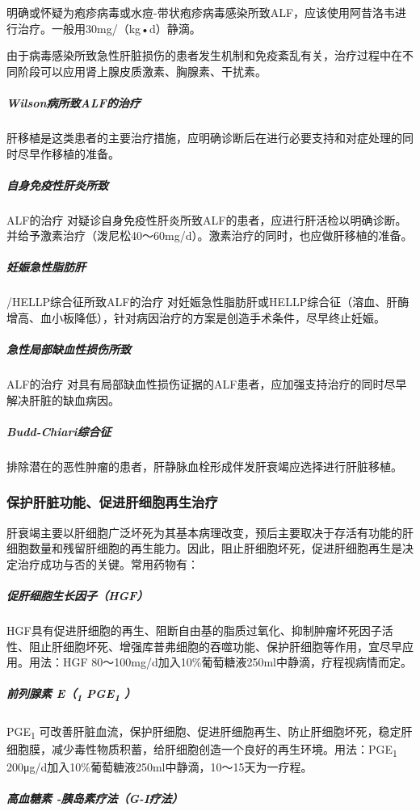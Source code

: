 明确或怀疑为疱疹病毒或水痘-带状疱疹病毒感染所致ALF，应该使用阿昔洛韦进行治疗。一般用30mg/（kg•d）静滴。

由于病毒感染所致急性肝脏损伤的患者发生机制和免疫紊乱有关，治疗过程中在不同阶段可以应用肾上腺皮质激素、胸腺素、干扰素。

\subparagraph{Wilson病所致ALF的治疗}

肝移植是这类患者的主要治疗措施，应明确诊断后在进行必要支持和对症处理的同时尽早作移植的准备。

\subparagraph{自身免疫性肝炎所致}

ALF的治疗
对疑诊自身免疫性肝炎所致ALF的患者，应进行肝活检以明确诊断。并给予激素治疗（泼尼松40～60mg/d）。激素治疗的同时，也应做肝移植的准备。

\subparagraph{妊娠急性脂肪肝}

/HELLP综合征所致ALF的治疗
对妊娠急性脂肪肝或HELLP综合征（溶血、肝酶增高、血小板降低），针对病因治疗的方案是创造手术条件，尽早终止妊娠。

\subparagraph{急性局部缺血性损伤所致}

ALF的治疗
对具有局部缺血性损伤证据的ALF患者，应加强支持治疗的同时尽早解决肝脏的缺血病因。

\subparagraph{Budd-Chiari综合征}

排除潜在的恶性肿瘤的患者，肝静脉血栓形成伴发肝衰竭应选择进行肝脏移植。

\subsubsection{保护肝脏功能、促进肝细胞再生治疗}

肝衰竭主要以肝细胞广泛坏死为其基本病理改变，预后主要取决于存活有功能的肝细胞数量和残留肝细胞的再生能力。因此，阻止肝细胞坏死，促进肝细胞再生是决定治疗成功与否的关键。常用药物有：

\subparagraph{促肝细胞生长因子（HGF）}

HGF具有促进肝细胞的再生、阻断自由基的脂质过氧化、抑制肿瘤坏死因子活性、阻止肝细胞坏死、增强库普弗细胞的吞噬功能、保护肝细胞等作用，宜尽早应用。用法：HGF
80～100mg/d加入10\%葡萄糖液250ml中静滴，疗程视病情而定。

\subparagraph{前列腺素 E（\textsubscript{1} PGE\textsubscript{1} ）}

PGE\textsubscript{1}
可改善肝脏血流，保护肝细胞、促进肝细胞再生、防止肝细胞坏死，稳定肝细胞膜，减少毒性物质积蓄，给肝细胞创造一个良好的再生环境。用法：PGE\textsubscript{1}
200μg/d加入10\%葡萄糖液250ml中静滴，10～15天为一疗程。

\subparagraph{高血糖素 -胰岛素疗法（G-I疗法）}

